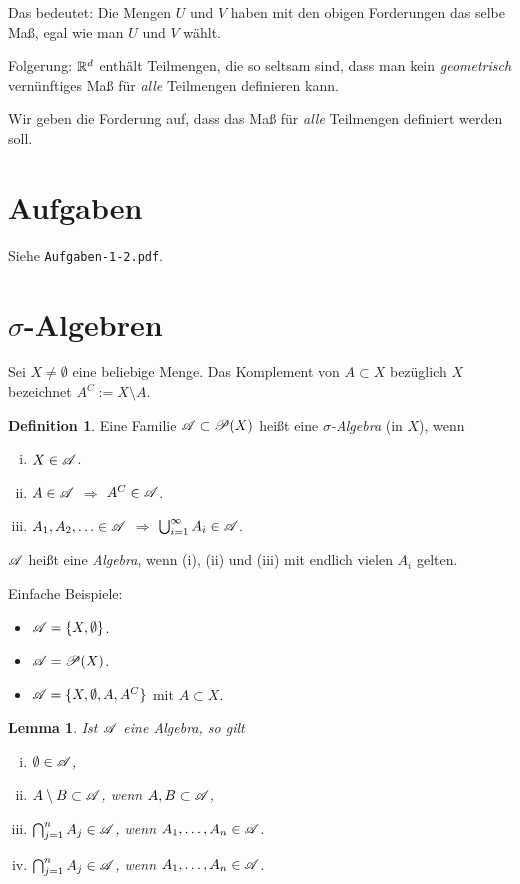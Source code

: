 \documentclass[
 a4paper,
 12pt,
 parskip=half
 ]{scrreprt}
\theoremstyle{plain}
\newtheorem{lem}[thm]{Lemma}
\theoremstyle{definition}
\newtheorem{defn}[thm]{Definition}
\numberwithin{equation}{section}
\begin{document}
Das bedeutet: Die Mengen $U$ und $V$ haben mit den obigen Forderungen das selbe Maß, egal wie man $U$ und $V$ wählt.

Folgerung: $\mathbb{R}^d$ enthält Teilmengen, die so seltsam sind, dass man kein \emph{geometrisch} vernünftiges Maß für \emph{alle} Teilmengen definieren kann.

Wir geben die Forderung auf, dass das Maß für \emph{alle} Teilmengen definiert werden soll.

\section{Aufgaben}
 Siehe \verb+Aufgaben-1-2.pdf+.

\section{\texorpdfstring{$\sigma$}{Sigma}-Algebren}
Sei $X \ne \emptyset$ eine beliebige Menge. Das Komplement von $A \subset X$ bezüglich $X$ bezeichnet $A^C := X \setminus A$.

\begin{defn}
 Eine Familie $\mathscr{A} \subset \mathscr{P}(X)$ heißt eine \emph{$\sigma$-Algebra} (in $X$), wenn
 \begin{enumerate}[(i)]
  \item $X \in \mathscr{A}$.
  \item $A \in \mathscr{A}$ $\Rightarrow$ $A^C \in \mathscr{A}$.
  \item $A_1, A_2, \ldots \in \mathscr{A}$ $\Rightarrow$ $\bigcup_{i=1}^\infty A_i \in \mathscr{A}$.
 \end{enumerate}
 $\mathscr{A}$ heißt eine \emph{Algebra}, wenn (i), (ii) und (iii) mit endlich vielen $A_i$ gelten.
\end{defn}

Einfache Beispiele:
\begin{itemize}
 \item $\mathscr{A} = \{ X, \emptyset \}$.
 \item $\mathscr{A} = \mathscr{P}( X )$.
 \item $\mathscr{A} = \{ X, \emptyset, A, A^C \}$ mit $A \subset X$.
\end{itemize}

\begin{lem}
 Ist $\mathscr{A}$ eine Algebra, so gilt
 \begin{enumerate}[(i)]
  \item $\emptyset \in \mathscr{A}$,
  \item $A \setminus B \subset \mathscr{A}$, wenn $A,B \subset \mathscr{A}$,
  \item $\bigcap_{j=1}^n A_j \in \mathscr{A}$, wenn $A_1, \ldots, A_n \in \mathscr{A}$.
  \item $\bigcap_{j=1}^n A_j \in \mathscr{A}$, wenn $A_1, \ldots, A_n \in \mathscr{A}$.
 \end{enumerate}
\end{lem}
\end{document}
